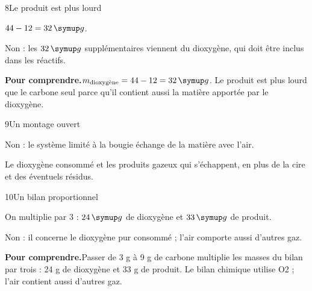 \par\noindent\begin{minipage}{\linewidth}
\begin{corrige}{8}{Le produit est plus lourd}
\begin{questions}
\item $44-12=32\unite g$.
\item Non : les $32\unite g$ supplémentaires viennent du dioxygène, qui doit être inclus dans les réactifs.
\end{questions}
\par\smallskip\noindent\textbf{Pour comprendre.}\enspace $m_{\text{dioxygène}}=44-12=32\unite g$. Le produit est plus lourd que le carbone seul parce qu’il contient aussi la matière apportée par le dioxygène.\par
\end{corrige}
\end{minipage}
\par\noindent\begin{minipage}{\linewidth}
\begin{corrige}{9}{Un montage ouvert}
\begin{questions}
\item Non : le système limité à la bougie échange de la matière avec l’air.
\item Le dioxygène consommé et les produits gazeux qui s’échappent, en plus de la cire et des éventuels résidus.
\end{questions}
\end{corrige}
\end{minipage}
\par\noindent\begin{minipage}{\linewidth}
\begin{corrige}{10}{Un bilan proportionnel}
\begin{questions}
\item On multiplie par 3 : $24\unite g$ de dioxygène et $33\unite g$ de produit.
\item Non : il concerne le dioxygène pur consommé ; l’air comporte aussi d’autres gaz.
\end{questions}
\par\smallskip\noindent\textbf{Pour comprendre.}\enspace Passer de 3 g à 9 g de carbone multiplie les masses du bilan par trois : 24 g de dioxygène et 33 g de produit. Le bilan chimique utilise O2 ; l’air contient aussi d’autres gaz.\par
\end{corrige}
\end{minipage}
